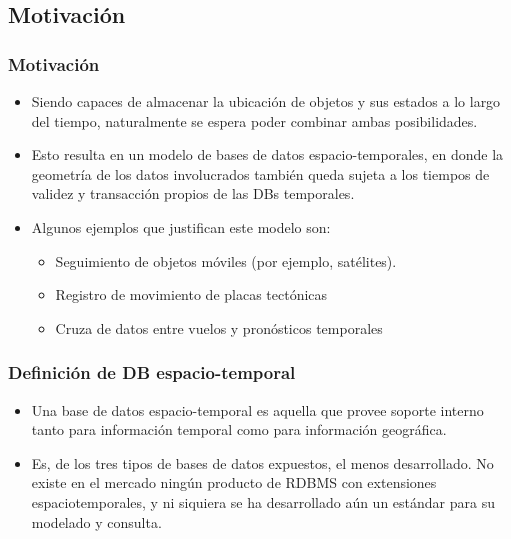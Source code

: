 
\subsection{Motivación}

\begin{frame}
\frametitle{Motivación}
\begin{itemize}
	\item	Siendo capaces de almacenar la ubicación de objetos y
	sus estados a lo largo del tiempo, naturalmente se espera poder
	combinar ambas posibilidades. \pause

	\item	Esto resulta en un modelo de bases de datos
	espacio-temporales, en donde la geometría de los datos involucrados
	también queda sujeta a los tiempos de validez y transacción propios
	de las DBs temporales. \pause

	\item	Algunos ejemplos que justifican este modelo son: \pause
	\begin{itemize}
	\item	Seguimiento de objetos móviles (por ejemplo, satélites). \pause
	\item	Registro de movimiento de placas tectónicas \pause
	\item	Cruza de datos entre vuelos y pronósticos temporales
	\end{itemize}
\end{itemize}
\end{frame}

\begin{frame}
\frametitle{Definición de DB espacio-temporal}
\begin{itemize}
	\item	Una base de datos espacio-temporal es aquella que provee
	soporte interno tanto para información temporal como para información
	geográfica. \pause \\

	\item	Es, de los tres tipos de bases de datos expuestos, el menos
	desarrollado. No existe en el mercado ningún producto de RDBMS con
	extensiones espaciotemporales, y ni siquiera se ha desarrollado aún un
	estándar para su modelado y consulta.
\end{itemize}
\end{frame}

